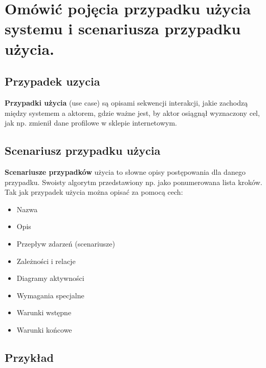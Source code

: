 \section{Omówić pojęcia przypadku użycia systemu i scenariusza przypadku użycia.}

\subsection{Przypadek uzycia}

\textbf{Przypadki użycia} (use case) są opisami sekwencji interakcji, jakie zachodzą między systemem a aktorem,
gdzie ważne jest, by aktor osiągnął wyznaczony cel, jak np. zmienił dane profilowe w sklepie internetowym.

\subsection{Scenariusz przypadku użycia}

\textbf{Scenariusze przypadków} użycia to słowne opisy postępowania dla danego przypadku.
Swoisty algorytm przedstawiony np. jako ponumerowana lista kroków.
Tak jak przypadek użycia można opisać za pomocą cech:
\begin{itemize}[itemsep=0pt,partopsep=0pt, parsep=0pt]
    \item Nazwa
    \item Opis
    \item Przepływ zdarzeń (scenariusze)
    \item Zależności i relacje
    \item Diagramy aktywności
    \item Wymagania specjalne
    \item Warunki wstępne
    \item Warunki końcowe
\end{itemize}

\subsection{Przykład}

